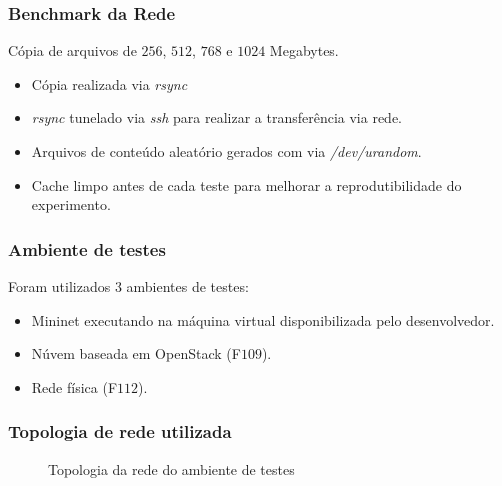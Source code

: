 \documentclass{beamer}
\begin{document}
\begin{frame}
    \frametitle{Benchmark da Rede}

    Cópia de arquivos de $256$, $512$, $768$ e $1024$ Megabytes.

    \begin{itemize}
        \item Cópia realizada via \textit{rsync}
        \item \textit{rsync} tunelado via \textit{ssh} para realizar a transferência via rede.
        \item Arquivos de conteúdo aleatório gerados com via \textit{/dev/urandom}.
        \item Cache limpo antes de cada teste para melhorar a reprodutibilidade do experimento.
    \end{itemize}
\end{frame}

\begin{frame}
    \frametitle{Ambiente de testes}

    Foram utilizados 3 ambientes de testes:

    \begin{itemize}
        \item Mininet executando na máquina virtual disponibilizada pelo desenvolvedor.
        \item Núvem baseada em OpenStack (F$109$).
        \item Rede física (F$112$).
    \end{itemize}
\end{frame}

\begin{frame}
    \frametitle{Topologia de rede utilizada}

    \begin{figure}[h]
        \centering
        \caption{Topologia da rede do ambiente de testes}
    \end{figure}
\end{frame}
\end{document}
